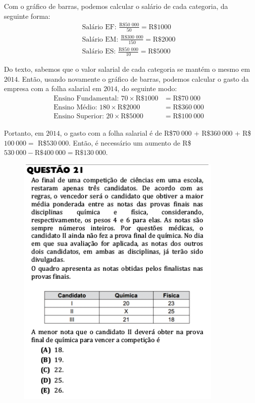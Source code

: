 \documentclass[a4paper]{article}
\begin{document}
\par\vspace{0.3cm} Com o gráfico de barras, podemos calcular o salário de cada categoria, da seguinte forma:
\begin{align*}
\text{Salário EF: } \frac{\text{R\$50\ 000}}{50} = \text{R\$}1000 \\
\text{Salário EM: } \frac{\text{R\$300\ 000}}{150} = \text{R\$}2000 \\
\text{Salário ES: } \frac{\text{R\$50\ 000}}{10} = \text{R\$}5000 
\end{align*}
\par\vspace{0.3cm} Do texto, sabemos que o valor salarial de cada categoria se mantém o mesmo em $2014$. Então, usando novamente o gráfico de barras, podemos calcular o gasto da empresa com a folha salarial em $2014$, do seguinte modo:
\begin{align*}
\text{Ensino Fundamental: }70\times \text{R\$}1000 &= \text{R\$}70\ 000 \\ 
\text{Ensino Médio: }180\times \text{R\$}2000 &= \text{R\$}360\ 000 \\
\text{Ensino Superior: }20\times \text{R\$}5000 &= \text{R\$}100\ 000 
\end{align*}
\par\vspace{0.3cm} Portanto, em $2014$, o gasto com a folha salarial é de R\$$70\ 000$ + R\$$360\ 000$ + R\$$100\ 000 = $ R\$$530\ 000$. Então, é necessário um aumento de R\$$530\ 000 - \text{R\$}400\ 000 = \text{R\$}130\ 000$.
\begin{figure}[H]
	\begin{center}
		\includegraphics[width=10cm]{L1Q21.png}
	\end{center}
\end{figure}
\end{document}
